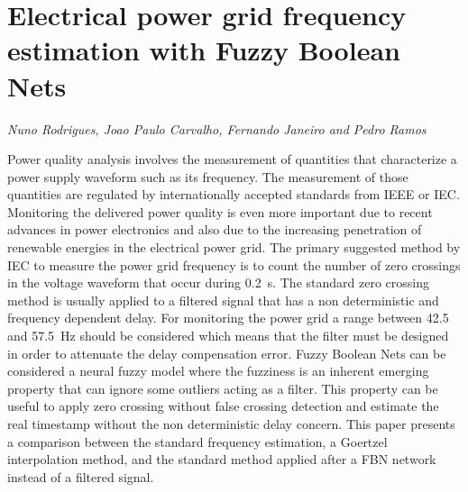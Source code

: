 \documentclass[../booklet.tex]{subfiles}
\begin{document}
\section[Electrical power grid frequency estimation with Fuzzy Boolean Nets. {\it Nuno Rodrigues, Joao Paulo Carvalho, Fernando Janeiro and Pedro Ramos}]{Electrical power grid frequency estimation with Fuzzy Boolean Nets}
   

\begin{center}
  {\it Nuno Rodrigues, Joao Paulo Carvalho, Fernando Janeiro and Pedro Ramos}
\end{center}

\vskip 0.8cm


Power quality analysis involves the measurement of quantities that characterize a power supply waveform such as its frequency. The measurement of those quantities are regulated by internationally accepted standards from IEEE or IEC. Monitoring the delivered power quality is even more important due to recent advances in power electronics and also due to the increasing penetration of renewable energies in the electrical power grid. The primary suggested method by IEC to measure the power grid frequency is to count the number of zero crossings in the voltage waveform that occur during 0.2~s. The standard zero crossing method is usually applied to a filtered signal that has a non deterministic and frequency dependent delay. For monitoring the power grid a range between 42.5 and 57.5~Hz should be considered which means that the filter must be designed in order to attenuate the delay compensation error. Fuzzy Boolean Nets can be considered a neural fuzzy model where the fuzziness is an inherent emerging property that can ignore some outliers acting as a filter. This property can be useful to apply zero crossing without false crossing detection and estimate the real timestamp without the non deterministic delay concern. This paper presents a comparison between the standard frequency estimation, a Goertzel interpolation method, and the standard method applied after a FBN network instead of a filtered signal.

\end{document}
